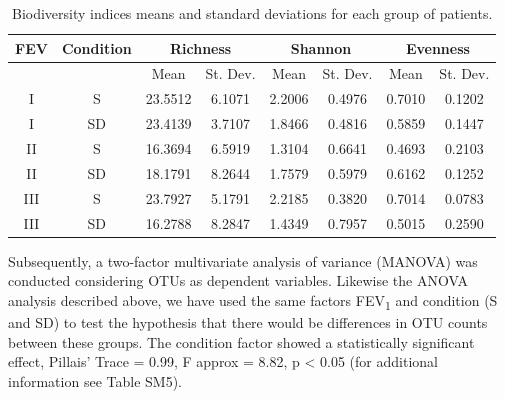 \begin{table}
\centering
\scriptsize
\begin{tabular}{ c c c c c c c c } 
\hline
FEV & Condition & \multicolumn{2}{c}{Richness} & \multicolumn{2}{c}{Shannon} & \multicolumn{2}{c}{Evenness}\\
\hline\hline
  &  & Mean & St. Dev. & Mean & St. Dev. & Mean & St. Dev. \\
I & S & 23.5512 & 6.1071 & 2.2006 & 0.4976 & 0.7010 & 0.1202 \\
I & SD & 23.4139 & 3.7107 & 1.8466 & 0.4816 & 0.5859 & 0.1447 \\
II & S & 16.3694 & 6.5919 & 1.3104 & 0.6641 & 0.4693 & 0.2103 \\
II & SD & 18.1791 & 8.2644 & 1.7579 & 0.5979 & 0.6162 & 0.1252 \\
III & S & 23.7927 & 5.1791 & 2.2185 & 0.3820 & 0.7014 & 0.0783 \\
III & SD & 16.2788 & 8.2847 & 1.4349 & 0.7957 & 0.5015 & 0.2590 \\
\hline
\end{tabular}
\caption{\label{tab:ffc216s}Biodiversity indices means and standard deviations for each group of patients.} 
\end{table}
Subsequently, a two-factor multivariate analysis of variance (MANOVA) was conducted considering OTUs as dependent variables. Likewise the ANOVA analysis described above, we have used the same factors FEV\textsubscript{1} and condition (S and SD) to test the hypothesis that there would be differences in OTU counts between these groups. The condition factor showed a statistically significant effect, Pillais' Trace = 0.99, F approx = 8.82, p {\textless} 0.05 (for additional information see Table SM5).\\
